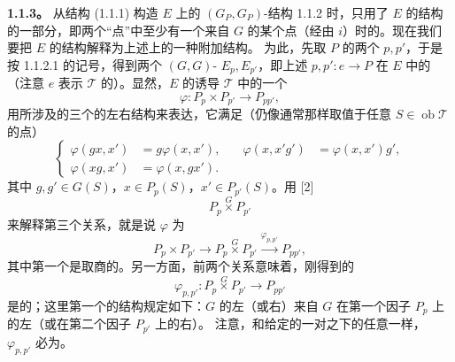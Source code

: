 \textbf{1.1.3。} 从结构 (1.1.1) 构造 $E$ 上的 $(G_P,G_P)$-结构 1.1.2 时，只用了 $E$ 的结构的一部分，即两个“点”中至少有一个来自 $G$ 的某个点（经由 $i$）时的。现在我们要把 $E$ 的结构解释为上述上的一种附加结构。
为此，先取 $P$ 的两个 $p,p'$，于是按 1.1.2.1 的记号，得到两个 $(G,G)$- $E_p,E_{p'}$，即上述 $p,p':e\to P$ 在 $E$ 中的（注意 $e$ 表示 $\mathcal T$ 的）。显然，$E$ 的诱导 $\mathcal T$ 中的一个
\[
\varphi:P_p\times P_{p'}\longrightarrow P_{pp'},
\]
用所涉及的三个的左右结构来表达，它满足（仍像通常那样取值于任意 $S\in\operatorname{ob}\mathcal T$ 的点）
\[
\left\{\begin{aligned}
\varphi(gx,x')&=g\varphi(x,x'),&\quad\varphi(x,x'g')&=\varphi(x,x')g',\\
\varphi(xg,x')&=\varphi(x,gx').
\end{aligned}\right.
\tag{1.1.3.0}
\]
其中 $g,g'\in G(S)$，$x\in P_p(S)$，$x'\in P_{p'}(S)$。用 [2]
\[
P_p\mathbin{\overset{G}{\times}}P_{p'}
\]
来解释第三个关系，就是说 $\varphi$ 为
\[
P_p\times P_{p'}\longrightarrow P_p\mathbin{\overset{G}{\times}}P_{p'}
\xrightarrow{\varphi_{p,p'}}P_{pp'},
\]
其中第一个是取商的。另一方面，前两个关系意味着，刚得到的
\[
\varphi_{p,p'}:P_p\mathbin{\overset{G}{\times}}P_{p'}\longrightarrow P_{pp'}
\tag{1.1.3.1}
\]
是的；这里第一个的结构规定如下：$G$ 的左（或右）来自 $G$ 在第一个因子 $P_p$ 上的左（或在第二个因子 $P_{p'}$ 上的右）。
注意，和给定的一对之下的任意一样， $\varphi_{p,p'}$ 必为。

